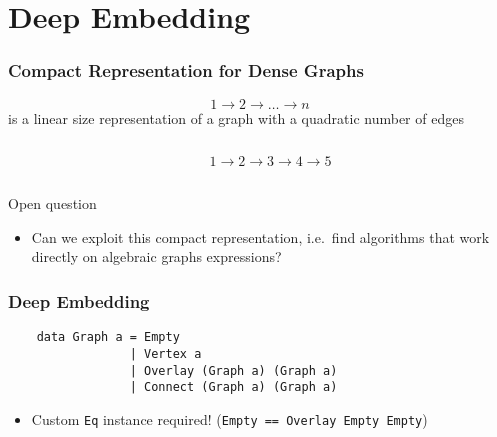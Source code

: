 \documentclass{beamer}
\newcommand{\hs}{\texttt}
\newcommand{\connect}{\rightarrow}
\begin{document}
\section{Deep Embedding}
\begin{frame}
  \frametitle{Compact Representation for Dense Graphs}
  \onslide<+->
  \[
    1 \connect 2 \connect \dots \connect n
  \]
  is a linear size representation of a graph with a quadratic number of edges
  \vspace{2mm} 
  \onslide<+->
  \begin{columns}
    \begin{column}{.25\textwidth}
    \end{column}
    \begin{column}{.45\textwidth}
      \small{$1 \connect 2 \connect 3 \connect 4 \connect 5$}
    \end{column}
  \end{columns}
  \onslide<+->
  \begin{exampleblock}{Open question}
    \begin{itemize}
    \item Can we exploit this compact representation, i.e.\ find algorithms that
      work directly on algebraic graphs expressions?
    \end{itemize}
  \end{exampleblock}
\end{frame}

\begin{frame}[fragile]
  \frametitle{Deep Embedding}
  \onslide<+->
  \begin{verbatim}
    data Graph a = Empty
                 | Vertex a
                 | Overlay (Graph a) (Graph a)
                 | Connect (Graph a) (Graph a)
  \end{verbatim}
  \onslide<+->          
  \begin{itemize}
  \item Custom \hs{Eq} instance required! (\hs{Empty == Overlay Empty Empty})
  \end{itemize}
\end{frame}
\end{document}
